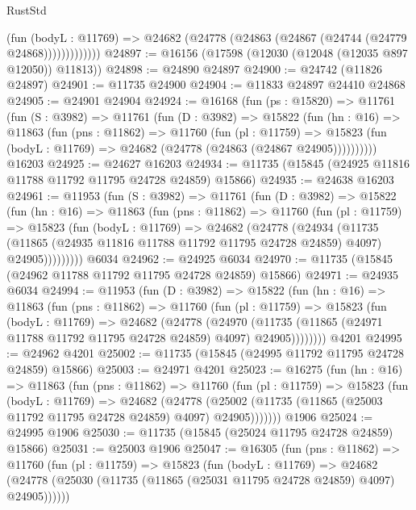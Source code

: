 \begin{lexlean}{RustStd}
\begin{coremodule}
                  (fun (bodyL : @11769) =>
                  @24682 (@24778 (@24863 (@24867 (@24744 (@24779 @24868)))))))))))))
@24897 := @16156 (@17598 (@12030 (@12048 (@12035 @897 @12050)) @11813))
@24898 := @24890 @24897
@24900 := @24742 (@11826 @24897)
@24901 := @11735 @24900
@24904 := @11833 @24897 @24410 @24868
@24905 := @24901 @24904
@24924 := @16168
    (fun (ps : @15820) =>
    @11761
      (fun (S : @3982) =>
      @11761
        (fun (D : @3982) =>
        @15822
          (fun (hn : @16) =>
          @11863
            (fun (pns : @11862) =>
            @11760
              (fun (pl : @11759) =>
              @15823 (fun (bodyL : @11769) => @24682 (@24778 (@24863 (@24867 @24905))))))))))
    @16203
@24925 := @24627 @16203
@24934 := @11735 (@15845 (@24925 @11816 @11788 @11792 @11795 @24728 @24859) @15866)
@24935 := @24638 @16203
@24961 := @11953
    (fun (S : @3982) =>
    @11761
      (fun (D : @3982) =>
      @15822
        (fun (hn : @16) =>
        @11863
          (fun (pns : @11862) =>
          @11760
            (fun (pl : @11759) =>
            @15823
              (fun (bodyL : @11769) =>
              @24682
                (@24778
                  (@24934
                    (@11735
                      (@11865 (@24935 @11816 @11788 @11792 @11795 @24728 @24859) @4097)
                      @24905)))))))))
    @6034
@24962 := @24925 @6034
@24970 := @11735 (@15845 (@24962 @11788 @11792 @11795 @24728 @24859) @15866)
@24971 := @24935 @6034
@24994 := @11953
    (fun (D : @3982) =>
    @15822
      (fun (hn : @16) =>
      @11863
        (fun (pns : @11862) =>
        @11760
          (fun (pl : @11759) =>
          @15823
            (fun (bodyL : @11769) =>
            @24682
              (@24778
                (@24970
                  (@11735 (@11865 (@24971 @11788 @11792 @11795 @24728 @24859) @4097) @24905))))))))
    @4201
@24995 := @24962 @4201
@25002 := @11735 (@15845 (@24995 @11792 @11795 @24728 @24859) @15866)
@25003 := @24971 @4201
@25023 := @16275
    (fun (hn : @16) =>
    @11863
      (fun (pns : @11862) =>
      @11760
        (fun (pl : @11759) =>
        @15823
          (fun (bodyL : @11769) =>
          @24682
            (@24778
              (@25002 (@11735 (@11865 (@25003 @11792 @11795 @24728 @24859) @4097) @24905)))))))
    @1906
@25024 := @24995 @1906
@25030 := @11735 (@15845 (@25024 @11795 @24728 @24859) @15866)
@25031 := @25003 @1906
@25047 := @16305
    (fun (pns : @11862) =>
    @11760
      (fun (pl : @11759) =>
      @15823
        (fun (bodyL : @11769) =>
        @24682 (@24778 (@25030 (@11735 (@11865 (@25031 @11795 @24728 @24859) @4097) @24905))))))

\end{coremodule}
\end{lexlean}
